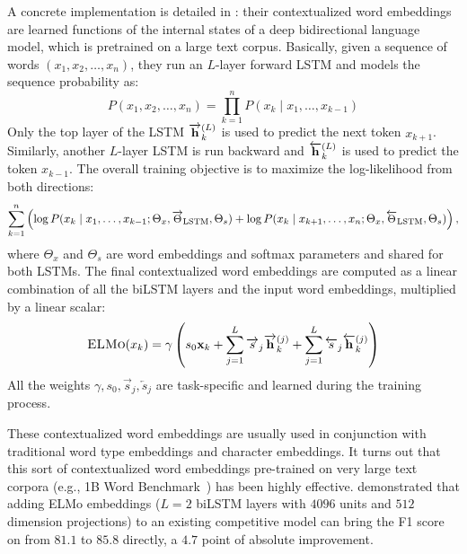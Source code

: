 A concrete implementation is  detailed in : their contextualized word embeddings are learned functions of the internal states of a deep bidirectional language model, which is pretrained on a large text corpus. Basically, given a sequence of words $(x_1, x_2, \ldots, x_n)$, they run an $L$-layer forward LSTM and models the sequence probability as:
\begin{equation}
    P(x_1, x_2, \ldots, x_n) =  \prod_{k = 1}^{n}P(x_k \mid x_1, \ldots, x_{k - 1})
\end{equation}
Only the top layer of the LSTM $\overrightarrow{\mathbf{h}}^{(L)}_k$ is used to predict the next token $x_{k + 1}$. Similarly, another $L$-layer LSTM is run backward and $\overleftarrow{\mathbf{h}}^{(L)}_k$ is used to predict the token $x_{k - 1}$. The overall training objective is to maximize the log-likelihood from both directions:
\begin{equation}
  \small
    \sum_{k=1}^{n}\left({\log P (x_k \mid x_1, \ldots, x_{k-1}; {\Theta}_x, \overrightarrow{{\Theta}}_{\text{LSTM}}, {\Theta}_s ) + \log P (x_k \mid x_{k+1}, \ldots, x_{n}; {\Theta}_x, \overleftarrow{{\Theta}}_{\text{LSTM}}, {\Theta}_s )}\right),
\end{equation}
where $\Theta_x$ and $\Theta_s$ are word embeddings and softmax parameters and shared for both LSTMs. The final contextualized word embeddings are computed as a linear combination of all the biLSTM layers and the input word embeddings, multiplied by a linear scalar:
\begin{equation}
    \textsc{ELMo}(x_k) = \gamma \left(s_0 \mathbf{x}_k + \sum_{j=1}^{L}{\overrightarrow{s}_{j} \overrightarrow{\mathbf{h}}^{(j)}_k} + \sum_{j=1}^{L}{\overleftarrow{s}_{j} \overleftarrow{\mathbf{h}}^{(j)}_k} \right)
\end{equation}
All the weights $\gamma, s_0, \overrightarrow{s}_{j}, \overleftarrow{s}_{j}$ are task-specific and learned during the training process.

These contextualized word embeddings are usually used in conjunction with traditional word type embeddings and character embeddings. It turns out that this sort of contextualized word embeddings pre-trained on very large text corpora (e.g., 1B Word Benchmark~\cite{chelba2014one}) has been highly effective.  demonstrated that adding ELMo embeddings ($L = 2$ biLSTM layers with $4096$ units and $512$ dimension projections) to an existing competitive model can bring the F1 score on  from $81.1$ to $85.8$ directly, a $4.7$ point of absolute improvement.

